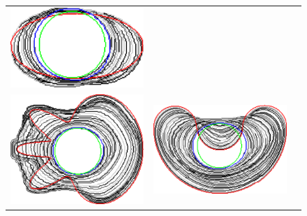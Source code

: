 \begin{figure}[]
\begin{tabular}{ccc}
\includegraphics[scale=0.25]{figures/chapter5/flow/ellipse/radius_5/ii/selastica/len_pen_0.01000/jonctions_1/best/gs_0.25000/summary.pdf}\\[2em]
\includegraphics[scale=0.25]{figures/chapter5/flow/flower/radius_5/ii/selastica/len_pen_0.01000/jonctions_1/best/gs_0.25000/summary.pdf} &
\includegraphics[scale=0.25]{figures/chapter5/flow/bean/radius_5/ii/selastica/len_pen_0.01000/jonctions_1/best/gs_0.25000/summary.pdf} &

\end{tabular}
\end{figure}
